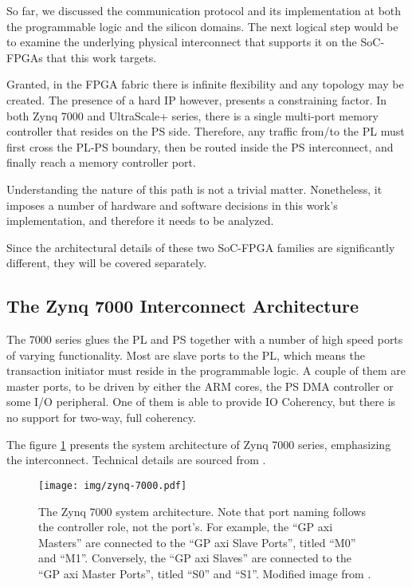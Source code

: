 So far, we discussed the communication protocol and its implementation at both 
the programmable logic and the silicon domains.
The next logical step would be to examine the underlying physical interconnect
that supports it on the SoC-FPGAs that this work targets. 

Granted, in the FPGA \gls{fabric} there is infinite flexibility and any topology may be created.
The presence of a hard IP however, presents a constraining factor.
In both Zynq 7000 and UltraScale+ series, 
there is a single multi-port memory controller
that resides on the PS side. Therefore, any traffic from/to the PL must
first cross the PL-PS boundary, then be routed inside the PS interconnect,
and finally reach a memory controller port. 

Understanding the nature of this path is not a trivial matter. 
Nonetheless, it imposes a number of hardware and software decisions
in this work's implementation, and therefore it needs to be analyzed.

Since the architectural details of these two SoC-FPGA families are
significantly different, they will be covered separately.

\subsection{The Zynq 7000 Interconnect Architecture}

The 7000 series glues the PL and PS together with a number of
high speed ports of varying functionality. Most are slave ports to the
PL, which means the transaction initiator must reside in the programmable logic.
A couple of them are master ports, to be driven by either the ARM cores,
the PS DMA controller or some I/O peripheral. 
One of them is able to provide \gls{IO Coherency},
but there is no support for two-way, full coherency.

The figure \ref{fig:zynq7000-interconnect} presents the system architecture 
of Zynq 7000 series, emphasizing the interconnect. 
Technical details are sourced from \cite{ug585}.

\begin{figure}[htbp]
  \centering
  \texttt{[image: img/zynq-7000.pdf]}
  \caption{The Zynq 7000 system architecture. 
  Note that port naming follows the controller role, not the port's.
  For example, the ``GP \gls{axi} Masters'' are connected to the
  ``GP \gls{axi} Slave Ports'', titled ``M0'' and ``M1''. Conversely,
  the ``GP \gls{axi} Slaves'' are connected to the ``GP \gls{axi} Master Ports'', titled ``S0'' and ``S1''.
  Modified image from \cite{ug585}.
  }
  \label{fig:zynq7000-interconnect}
\end{figure}

